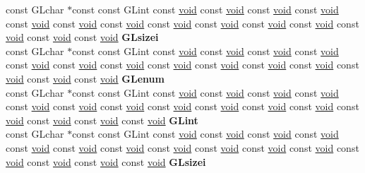 \begin{DoxyCompactItemize}
\begin{tabbing}
\>const GLchar $\ast$const const GLint const \hyperlink{interfacevoid}{void} const \hyperlink{interfacevoid}{void} const \hyperlink{interfacevoid}{void} const \hyperlink{interfacevoid}{void} const \hyperlink{interfacevoid}{void} const \hyperlink{interfacevoid}{void} const \hyperlink{interfacevoid}{void} const \hyperlink{interfacevoid}{void} const \hyperlink{interfacevoid}{void} const \hyperlink{interfacevoid}{void} const \hyperlink{interfacevoid}{void} const \hyperlink{interfacevoid}{void} const \hyperlink{interfacevoid}{void} const \hyperlink{interfacevoid}{void} {\bfseries GLsizei}\\
\>const GLchar $\ast$const const GLint const \hyperlink{interfacevoid}{void} const \hyperlink{interfacevoid}{void} const \hyperlink{interfacevoid}{void} const \hyperlink{interfacevoid}{void} const \hyperlink{interfacevoid}{void} const \hyperlink{interfacevoid}{void} const \hyperlink{interfacevoid}{void} const \hyperlink{interfacevoid}{void} const \hyperlink{interfacevoid}{void} const \hyperlink{interfacevoid}{void} const \hyperlink{interfacevoid}{void} const \hyperlink{interfacevoid}{void} const \hyperlink{interfacevoid}{void} const \hyperlink{interfacevoid}{void} {\bfseries GLenum}\\
\>const GLchar $\ast$const const GLint const \hyperlink{interfacevoid}{void} const \hyperlink{interfacevoid}{void} const \hyperlink{interfacevoid}{void} const \hyperlink{interfacevoid}{void} const \hyperlink{interfacevoid}{void} const \hyperlink{interfacevoid}{void} const \hyperlink{interfacevoid}{void} const \hyperlink{interfacevoid}{void} const \hyperlink{interfacevoid}{void} const \hyperlink{interfacevoid}{void} const \hyperlink{interfacevoid}{void} const \hyperlink{interfacevoid}{void} const \hyperlink{interfacevoid}{void} const \hyperlink{interfacevoid}{void} const \hyperlink{interfacevoid}{void} {\bfseries GLint}\\
\>const GLchar $\ast$const const GLint const \hyperlink{interfacevoid}{void} const \hyperlink{interfacevoid}{void} const \hyperlink{interfacevoid}{void} const \hyperlink{interfacevoid}{void} const \hyperlink{interfacevoid}{void} const \hyperlink{interfacevoid}{void} const \hyperlink{interfacevoid}{void} const \hyperlink{interfacevoid}{void} const \hyperlink{interfacevoid}{void} const \hyperlink{interfacevoid}{void} const \hyperlink{interfacevoid}{void} const \hyperlink{interfacevoid}{void} const \hyperlink{interfacevoid}{void} const \hyperlink{interfacevoid}{void} const \hyperlink{interfacevoid}{void} {\bfseries GLsizei}\\

\end{tabbing}
\end{DoxyCompactItemize}
